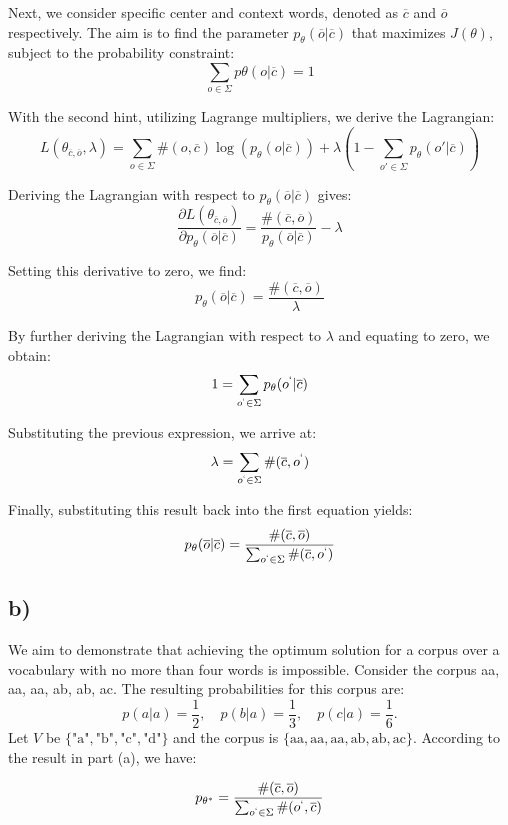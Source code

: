 \documentclass{article}
\begin{document}
Next, we consider specific center and context words, denoted as $\overline{c}$ and $\overline{o}$ respectively. The aim is to find the parameter $p_{\theta}(\overline{o}|\overline{c})$ that maximizes $J(\theta)$, subject to the probability constraint:
\[
\sum_{o \in \Sigma} p{\theta}(o|\overline{c}) = 1
\]

With the second hint, utilizing Lagrange multipliers, we derive the Lagrangian:
\[
L(\theta_{\overline{c},\overline{o}}, \lambda) = \sum_{o \in \Sigma} \#(o, \overline{c}) \log(p_{\theta}(o|\overline{c})) + \lambda \left(1 - \sum_{o' \in \Sigma} p_\theta(o'|\overline{c})\right)
\]

Deriving the Lagrangian with respect to $p_{\theta}(\overline{o}| \overline{c})$ gives:
\[
\frac{\partial L(\theta_{\overline{c},\overline{o}})}{\partial p_{\theta}(\overline{o}|\overline{c})}  = \frac{\#(\overline{c},  \overline{o})}{p_{\theta}(\overline{o}|\overline{c})} -\lambda
\]

Setting this derivative to zero, we find:
\[
p_{\theta}(\overline{o}|\overline{c}) = \frac{\#(\overline{c},\overline{o})}{\lambda}
\]

By further deriving the Lagrangian with respect to $\lambda$ and equating to zero, we obtain:
\[
1 = \sum_{o^{`} \in \Sigma} p_{\theta}(o^{`} | \overline{c})
\]

Substituting the previous expression, we arrive at:
\[
\lambda  = \sum_{o^{`} \in \Sigma} \#(\overline{c}, o^{`})
\]

Finally, substituting this result back into the first equation yields:
\[
p_{\theta}(\overline{o} | \overline{c}) = \frac{\#(\overline{c},\overline{o})}{\sum_{o^{`} \in \Sigma}\#(\overline{c}, o^{`})}
\]
\clearpage
\subsection*{b)}

We aim to demonstrate that achieving the optimum solution for a corpus over a vocabulary with no more than four words is impossible. Consider the corpus {aa, aa, aa, ab, ab, ac}. The resulting probabilities for this corpus are:
\[
p(a|a) = \frac{1}{2}, \quad p(b|a) = \frac{1}{3}, \quad p(c|a) = \frac{1}{6}.
\]
Let $V$ be $\{ \text{"a"}, \text{"b"}, \text{"c"}, \text{"d"} \}$ and the corpus is $\{ \text{aa}, \text{aa}, \text{aa}, \text{ab}, \text{ab}, \text{ac} \}$. According to the result in part (a), we have:

\[
p_{\theta^{*}} = \frac{\#(\overline{c},\overline{o})}{\sum_{o^{`} \in \Sigma} \#(o^{`}, \overline{c})}
\]
\end{document}
